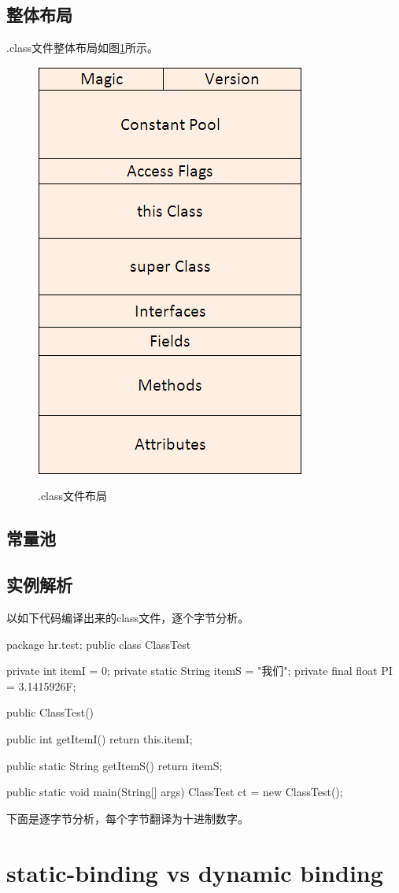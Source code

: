 \documentclass[a4paper,11pt]{article}
\begin{document}
\subsection[整体布局]{整体布局}
.class文件整体布局如图\ref{fig:dotclass}所示。

\begin{figure}
  \centering
  \includegraphics[width=.4\textwidth]{picturedir/JavaClassFileLayout.png}\\
  \caption{.class文件布局}\label{fig:dotclass}
\end{figure}


\subsection[常量池]{常量池}

\subsection[实例解析]{实例解析}
以如下代码编译出来的class文件，逐个字节分析。

\begin{javacode}
package hr.test;
public class ClassTest {
  private int itemI = 0;
  private static String itemS = "我们";
  private final float PI = 3.1415926F;

  public ClassTest() { }

  public int getItemI() {
    return this.itemI;
  }

  public static String getItemS() {
    return itemS;
  }

  public static void main(String[] args) {
    ClassTest ct = new ClassTest();
  }
}
\end{javacode}

下面是逐字节分析，每个字节翻译为十进制数字。




\section[static-binding vs dynamic binding]{static-binding vs dynamic binding}
\end{document}
